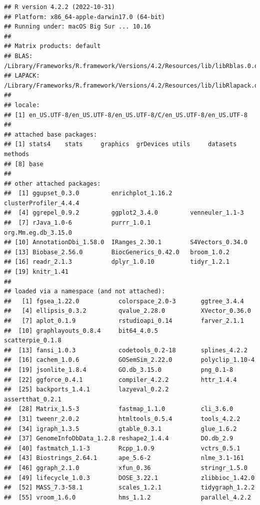 \documentclass[
]{article}
\begin{document}
\begin{verbatim}
## R version 4.2.2 (2022-10-31)
## Platform: x86_64-apple-darwin17.0 (64-bit)
## Running under: macOS Big Sur ... 10.16
## 
## Matrix products: default
## BLAS:   /Library/Frameworks/R.framework/Versions/4.2/Resources/lib/libRblas.0.dylib
## LAPACK: /Library/Frameworks/R.framework/Versions/4.2/Resources/lib/libRlapack.dylib
## 
## locale:
## [1] en_US.UTF-8/en_US.UTF-8/en_US.UTF-8/C/en_US.UTF-8/en_US.UTF-8
## 
## attached base packages:
## [1] stats4    stats     graphics  grDevices utils     datasets  methods  
## [8] base     
## 
## other attached packages:
##  [1] ggupset_0.3.0         enrichplot_1.16.2     clusterProfiler_4.4.4
##  [4] ggrepel_0.9.2         ggplot2_3.4.0         venneuler_1.1-3      
##  [7] rJava_1.0-6           purrr_1.0.1           org.Mm.eg.db_3.15.0  
## [10] AnnotationDbi_1.58.0  IRanges_2.30.1        S4Vectors_0.34.0     
## [13] Biobase_2.56.0        BiocGenerics_0.42.0   broom_1.0.2          
## [16] readr_2.1.3           dplyr_1.0.10          tidyr_1.2.1          
## [19] knitr_1.41           
## 
## loaded via a namespace (and not attached):
##   [1] fgsea_1.22.0           colorspace_2.0-3       ggtree_3.4.4          
##   [4] ellipsis_0.3.2         qvalue_2.28.0          XVector_0.36.0        
##   [7] aplot_0.1.9            rstudioapi_0.14        farver_2.1.1          
##  [10] graphlayouts_0.8.4     bit64_4.0.5            scatterpie_0.1.8      
##  [13] fansi_1.0.3            codetools_0.2-18       splines_4.2.2         
##  [16] cachem_1.0.6           GOSemSim_2.22.0        polyclip_1.10-4       
##  [19] jsonlite_1.8.4         GO.db_3.15.0           png_0.1-8             
##  [22] ggforce_0.4.1          compiler_4.2.2         httr_1.4.4            
##  [25] backports_1.4.1        lazyeval_0.2.2         assertthat_0.2.1      
##  [28] Matrix_1.5-3           fastmap_1.1.0          cli_3.6.0             
##  [31] tweenr_2.0.2           htmltools_0.5.4        tools_4.2.2           
##  [34] igraph_1.3.5           gtable_0.3.1           glue_1.6.2            
##  [37] GenomeInfoDbData_1.2.8 reshape2_1.4.4         DO.db_2.9             
##  [40] fastmatch_1.1-3        Rcpp_1.0.9             vctrs_0.5.1           
##  [43] Biostrings_2.64.1      ape_5.6-2              nlme_3.1-161          
##  [46] ggraph_2.1.0           xfun_0.36              stringr_1.5.0         
##  [49] lifecycle_1.0.3        DOSE_3.22.1            zlibbioc_1.42.0       
##  [52] MASS_7.3-58.1          scales_1.2.1           tidygraph_1.2.2       
##  [55] vroom_1.6.0            hms_1.1.2              parallel_4.2.2        

\end{verbatim}
\end{document}
